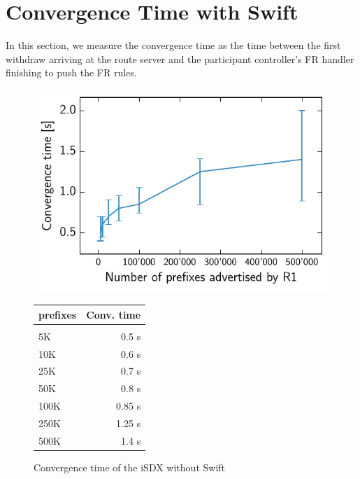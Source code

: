 \section{\label{chapter5:Convergence time with Swift}Convergence Time with Swift}

In this section, we measure the convergence time as the time between the first withdraw arriving at the route server and the participant controller's FR handler finishing to push the FR rules.

\begin{figure}[h]
\centering
\begin{minipage}[t]{.4\textwidth}
\centering
\vspace{0pt}
\includegraphics[scale = 1]{Figures/swift.pdf}
\end{minipage}\hfill
\begin{minipage}[t]{.4\textwidth}
\centering
\vspace{0pt}
\begin{tabular}{@{}lr@{}}
	\\
	prefixes & Conv. time \\
	\hline
	\\
    5K & 0.5 s  \\
    10K & 0.6 s   \\
    25K & 0.7 s   \\
    50K & 0.8 s  \\
    100K & 0.85 s \\
    250K & 1.25 s   \\
    500K & 1.4 s  \\
\end{tabular}
\end{minipage}
\caption{Convergence time of the iSDX without Swift}
\label{fig:withswift}
\end{figure}

